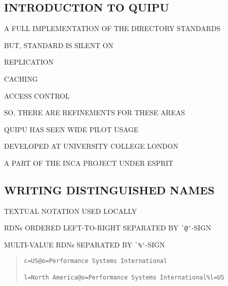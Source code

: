\begin{bwslide}
\part	{INTRODUCTION TO QUIPU}\bf

\begin{nrtc}
\item	A FULL IMPLEMENTATION OF THE DIRECTORY STANDARDS

\item	BUT, STANDARD IS SILENT ON
    \begin{nrtc}
    \item	REPLICATION

    \item	CACHING

    \item	ACCESS CONTROL
    \end{nrtc}

\item	SO, THERE ARE REFINEMENTS FOR THESE AREAS

\item	QUIPU HAS SEEN WIDE PILOT USAGE
\end{nrtc}
\end{bwslide}


\begin{bwslide}

\begin{nrtc}
\item	DEVELOPED AT UNIVERSITY COLLEGE LONDON

\item	A PART OF THE INCA PROJECT UNDER ESPRIT
\end{nrtc}
\end{bwslide}


\begin{bwslide}
\part*	{WRITING DISTINGUISHED NAMES}\bf

\begin{nrtc}
\item	TEXTUAL NOTATION USED LOCALLY

\item	RDNs ORDERED LEFT-TO-RIGHT SEPARATED BY \verb"`@'"-SIGN

\item	MULTI-VALUE RDNs SEPARATED BY \verb"`%'"-SIGN
\end{nrtc}
\begin{quote}\small\begin{verbatim}
c=US@o=Performance Systems International

l=North America@o=Performance Systems International%l=US
\end{verbatim}\end{quote}
\end{bwslide}


